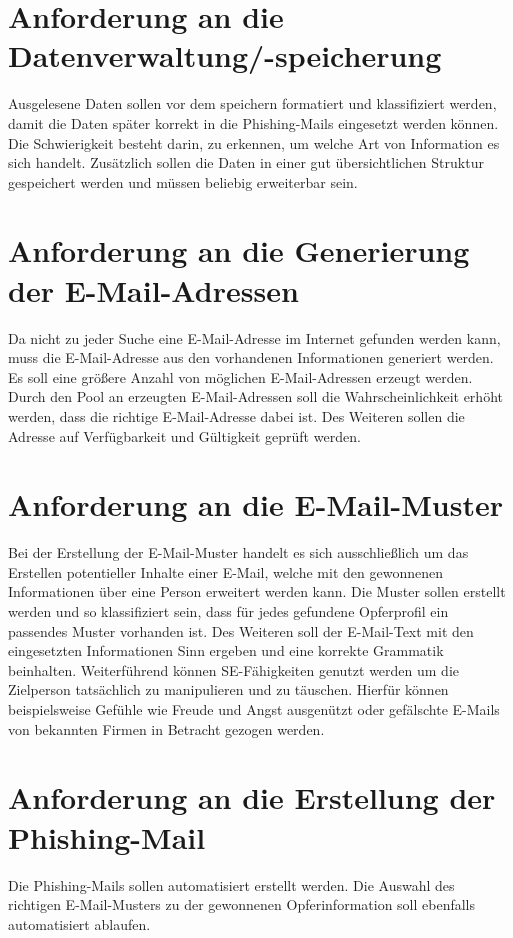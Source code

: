 \section{Anforderung an die Datenverwaltung/-speicherung}
Ausgelesene Daten sollen vor dem speichern formatiert und klassifiziert werden, damit die Daten später korrekt in die Phishing-Mails eingesetzt werden können. Die Schwierigkeit besteht darin, zu erkennen, um welche Art von Information es sich handelt. Zusätzlich sollen die Daten in einer gut übersichtlichen Struktur gespeichert werden und müssen beliebig erweiterbar sein.
	
\section{Anforderung an die Generierung der E-Mail-Adressen}
Da nicht zu jeder Suche eine E-Mail-Adresse im Internet gefunden werden kann, muss die E-Mail-Adresse aus den vorhandenen Informationen generiert werden. Es soll eine größere Anzahl von möglichen E-Mail-Adressen erzeugt werden. Durch den Pool an erzeugten E-Mail-Adressen soll die Wahrscheinlichkeit erhöht werden, dass die richtige E-Mail-Adresse dabei ist. Des Weiteren sollen die Adresse auf Verfügbarkeit und Gültigkeit geprüft werden.
	
\section{Anforderung an die E-Mail-Muster}
Bei der Erstellung der E-Mail-Muster handelt es sich ausschließlich um das Erstellen potentieller Inhalte einer E-Mail, welche mit den gewonnenen Informationen über eine Person erweitert werden kann. Die Muster sollen erstellt werden und so klassifiziert sein, dass für jedes gefundene Opferprofil ein passendes Muster vorhanden ist. Des Weiteren soll der E-Mail-Text mit den eingesetzten Informationen Sinn ergeben und eine korrekte Grammatik beinhalten. Weiterführend können SE-Fähigkeiten genutzt werden um die Zielperson tatsächlich zu manipulieren und zu täuschen. Hierfür können beispielsweise Gefühle wie Freude und Angst ausgenützt oder gefälschte E-Mails von bekannten Firmen in Betracht gezogen werden.
	
\section{Anforderung an die Erstellung der Phishing-Mail}
Die Phishing-Mails sollen automatisiert erstellt werden. Die Auswahl des richtigen E-Mail-Musters zu der gewonnenen Opferinformation soll ebenfalls automatisiert ablaufen.
